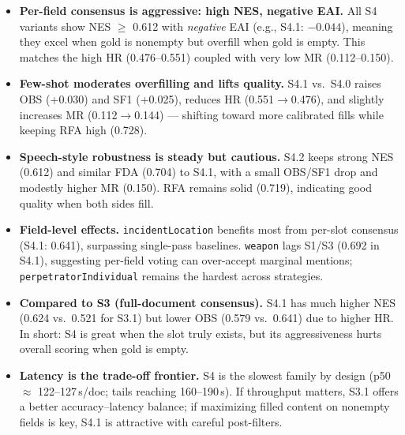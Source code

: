 \begin{itemize}
    \item \textbf{Per-field consensus is aggressive: high NES, negative EAI.} All S4 variants show NES $\geq$ 0.612 with \emph{negative} EAI (e.g., S4.1: $-0.044$), meaning they excel when gold is nonempty but overfill when gold is empty. This matches the high HR (0.476–0.551) coupled with very low MR (0.112–0.150).
    \item \textbf{Few-shot moderates overfilling and lifts quality.} S4.1 vs.\ S4.0 raises OBS (+0.030) and SF1 (+0.025), reduces HR (0.551$\rightarrow$0.476), and slightly increases MR (0.112$\rightarrow$0.144) — shifting toward more calibrated fills while keeping RFA high (0.728).
    \item \textbf{Speech-style robustness is steady but cautious.} S4.2 keeps strong NES (0.612) and similar FDA (0.704) to S4.1, with a small OBS/SF1 drop and modestly higher MR (0.150). RFA remains solid (0.719), indicating good quality when both sides fill.
    \item \textbf{Field-level effects.} \texttt{incidentLocation} benefits most from per-slot consensus (S4.1: 0.641), surpassing single-pass baselines. \texttt{weapon} lags S1/S3 (0.692 in S4.1), suggesting per-field voting can over-accept marginal mentions; \texttt{perpetratorIndividual} remains the hardest across strategies.
    \item \textbf{Compared to S3 (full-document consensus).} S4.1 has much higher NES (0.624 vs.\ 0.521 for S3.1) but lower OBS (0.579 vs.\ 0.641) due to higher HR. In short: S4 is great when the slot truly exists, but its aggressiveness hurts overall scoring when gold is empty.
    \item \textbf{Latency is the trade-off frontier.} S4 is the slowest family by design (p50 $\approx$ 122–127\,s/doc; tails reaching 160–190\,s). If throughput matters, S3.1 offers a better accuracy–latency balance; if maximizing filled content on nonempty fields is key, S4.1 is attractive with careful post-filters.
\end{itemize}
